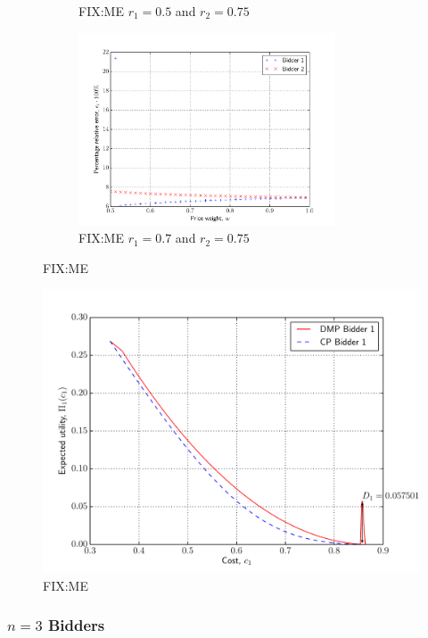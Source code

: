 \begin{figure}[p!]
\begin{subfigure}[b]{0.5\textwidth}
    \caption{FIX:ME $r_1=0.5$ and $r_2=0.75$}
    \label{fig:compare_2_bidders_050_075_approximation}
  \end{subfigure}
  \begin{subfigure}[b]{0.5\textwidth}
    \includegraphics[width=3in]{Approximation/Figures/compare_2_bidders_070_075}
    \caption{FIX:ME $r_1=0.7$ and $r_2=0.75$}
    \label{fig:compare_2_bidders_070_075_approximation}
  \end{subfigure}
  \caption{FIX:ME}
  \label{fig:compare_2_bidders_approximation}
\end{figure}

\begin{figure}[p!]
  \includegraphics[width=\figsize]{Approximation/Figures/compare_2_bidders_070_075_outlier}
  \caption{FIX:ME}
  \label{fig:compare_2_bidders_070_075_outlier_approximation}
\end{figure}


\subsubsection{$n=3$ Bidders} %
\label{ssub:n_3_bidders_approximation}

